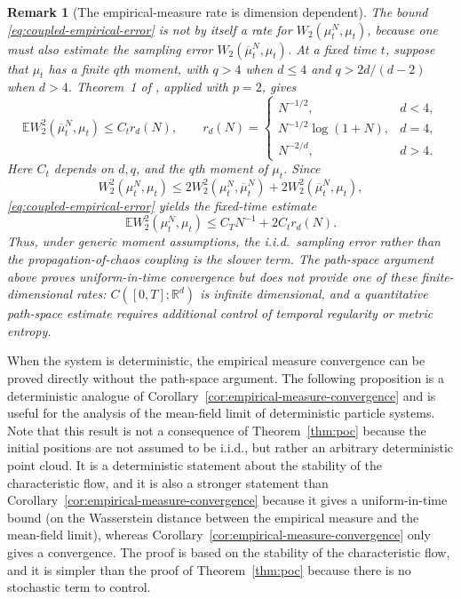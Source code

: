 \documentclass[11pt]{amsart}
\numberwithin{equation}{section}
\theoremstyle{plain}
\newtheorem{remark}[theorem]{Remark}
\newcommand{\R}{\mathbb{R}}
\newcommand{\E}{\mathbb{E}}
\begin{document}
\begin{remark}[The empirical-measure rate is dimension dependent]
\label{rem:empirical-measure-rate}
The bound \eqref{eq:coupled-empirical-error} is not by itself a rate for
$W_2(\mu_t^N,\mu_t)$, because one must also estimate the sampling error
$W_2(\overline\mu_t^N,\mu_t)$.  At a fixed time $t$, suppose that $\mu_t$ has
a finite $q$th moment, with $q>4$ when $d\leq4$ and
$q>2d/(d-2)$ when $d>4$.  Theorem~1 of
\cite{FournierGuillin2015}, applied with $p=2$, gives
\[
 \E W_2^2(\overline\mu_t^N,\mu_t)\leq C_t r_d(N),
 \qquad
 r_d(N)=
 \begin{cases}
  N^{-1/2},&d<4,\\
  N^{-1/2}\log(1+N),&d=4,\\
  N^{-2/d},&d>4.
 \end{cases}
\]
Here $C_t$ depends on $d,q$, and the $q$th moment of $\mu_t$.  Since
\[
 W_2^2(\mu_t^N,\mu_t)
 \leq2W_2^2(\mu_t^N,\overline\mu_t^N)
     +2W_2^2(\overline\mu_t^N,\mu_t),
\]
\eqref{eq:coupled-empirical-error} yields the fixed-time estimate
\[
 \E W_2^2(\mu_t^N,\mu_t)
 \leq C_TN^{-1}+2C_t r_d(N).
\]
Thus, under generic moment assumptions, the i.i.d.\ sampling error rather
than the propagation-of-chaos coupling is the slower term.  The path-space
argument above proves uniform-in-time convergence but does not provide one of
these finite-dimensional rates: $C([0,T];\R^d)$ is infinite dimensional, and
a quantitative path-space estimate requires additional control of temporal
regularity or metric entropy.
\end{remark}

When the system is deterministic, the empirical measure convergence can be proved directly without the path-space argument.  The following proposition is a
deterministic analogue of Corollary~\ref{cor:empirical-measure-convergence} and is useful for the analysis of the mean-field limit of deterministic particle systems. 
Note that this result is not a consequence of Theorem~\ref{thm:poc} because the initial positions are not assumed to be i.i.d., but rather an arbitrary deterministic point cloud. It is a deterministic statement about the stability of the characteristic flow, and it is also a stronger statement than Corollary~\ref{cor:empirical-measure-convergence} because it gives a uniform-in-time bound (on the Wasserstein distance between the empirical measure and the mean-field limit), whereas Corollary~\ref{cor:empirical-measure-convergence} only gives a convergence. 
The proof is based on the stability of the characteristic flow, and it is simpler than the proof of Theorem~\ref{thm:poc} because there is no stochastic term to control.  
\end{document}
